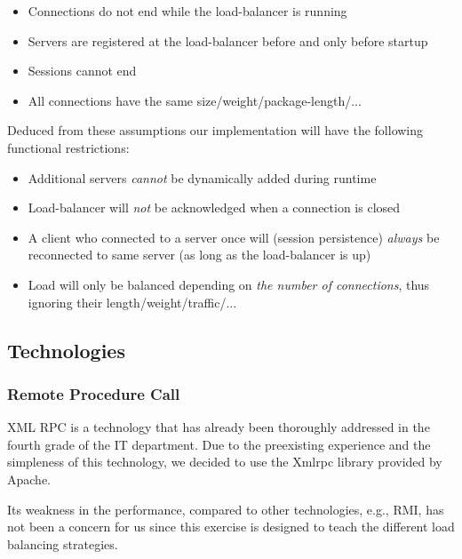 \documentclass[11pt, a4paper]{article}
\begin{document}
\vspace{-10pt}
\begin{itemize}
\item Connections do not end while the load-balancer is running
\item Servers are registered at the load-balancer before and only
  before startup
\item Sessions cannot end
\item All connections have the same size/weight/package-length/...
\end{itemize}
\vspace{-10pt}

Deduced from these assumptions our implementation will have the
following functional restrictions:

\vspace{-10pt}
\begin{itemize}
\item Additional servers \textit{cannot} be dynamically added during
  runtime
\item Load-balancer will \textit{not} be acknowledged when a
  connection is closed
\item A client who connected to a server once will (session
  persistence) \textit{always} be reconnected to same server (as long
  as the load-balancer is up)
\item Load will only be balanced depending on \textit{the number of
    connections}, thus ignoring their length/weight/traffic/...
\end{itemize}
\vspace{-10pt}

\subsection{Technologies}

\subsubsection{Remote Procedure Call}

XML RPC is a technology that has already been thoroughly addressed in
the fourth grade of the IT department. Due to the preexisting
experience and the simpleness of this technology, we decided to use
the Xmlrpc library provided by Apache.

Its weakness in the performance, compared to other technologies, e.g.,
RMI, has not been a concern for us since this exercise is designed to
teach the different load balancing strategies. 
\end{document}
